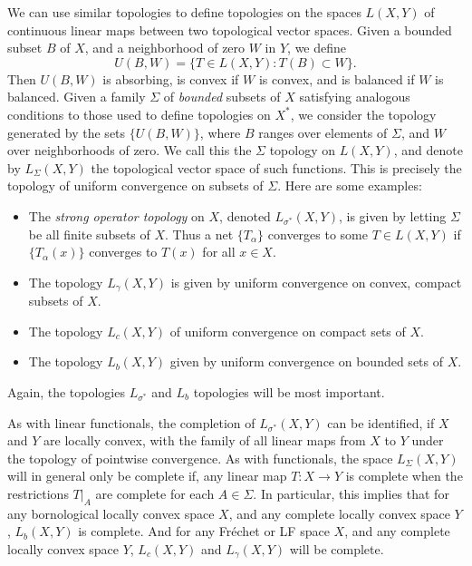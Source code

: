 We can use similar topologies to define topologies on the spaces $L(X,Y)$ of continuous linear maps between two topological vector spaces. Given a bounded subset $B$ of $X$, and a neighborhood of zero $W$ in $Y$, we define
%
\[ U(B,W) = \{ T \in L(X,Y): T(B) \subset W \}. \]
%
Then $U(B,W)$ is absorbing, is convex if $W$ is convex, and is balanced if $W$ is balanced. Given a family $\Sigma$ of \emph{bounded} subsets of $X$ satisfying analogous conditions to those used to define topologies on $X^*$, we consider the topology generated by the sets $\{ U(B,W) \}$, where $B$ ranges over elements of $\Sigma$, and $W$ over neighborhoods of zero. We call this the $\Sigma$ topology on $L(X,Y)$, and denote by $L_\Sigma(X,Y)$ the topological vector space of such functions. This is precisely the topology of uniform convergence on subsets of $\Sigma$. Here are some examples:
%
\begin{itemize}
    \item The \emph{strong operator topology} on $X$, denoted $L_{\sigma^*}(X,Y)$, is given by letting $\Sigma$ be all finite subsets of $X$. Thus a net $\{ T_\alpha \}$ converges to some $T \in L(X,Y)$ if $\{ T_\alpha(x) \}$ converges to $T(x)$ for all $x \in X$.

    \item The topology $L_\gamma(X,Y)$ is given by uniform convergence on convex, compact subsets of $X$.

    \item The topology $L_c(X,Y)$ of uniform convergence on compact sets of $X$.

    \item The topology $L_b(X,Y)$ given by uniform convergence on bounded sets of $X$.
\end{itemize}
%
Again, the topologies $L_{\sigma^*}$ and $L_b$ topologies will be most important.

As with linear functionals, the completion of $L_{\sigma^*}(X,Y)$ can be identified, if $X$ and $Y$ are locally convex, with the family of all linear maps from $X$ to $Y$ under the topology of pointwise convergence. As with functionals, the space $L_\Sigma(X,Y)$ will in general only be complete if, any linear map $T: X \to Y$ is complete when the restrictions $T|_A$ are complete for each $A \in \Sigma$. In particular, this implies that for any bornological locally convex space $X$, and any complete locally convex space $Y$, $L_b(X,Y)$ is complete. And for any Fr\'{e}chet or LF space $X$, and any complete locally convex space $Y$, $L_c(X,Y)$ and $L_\gamma(X,Y)$ will be complete.

